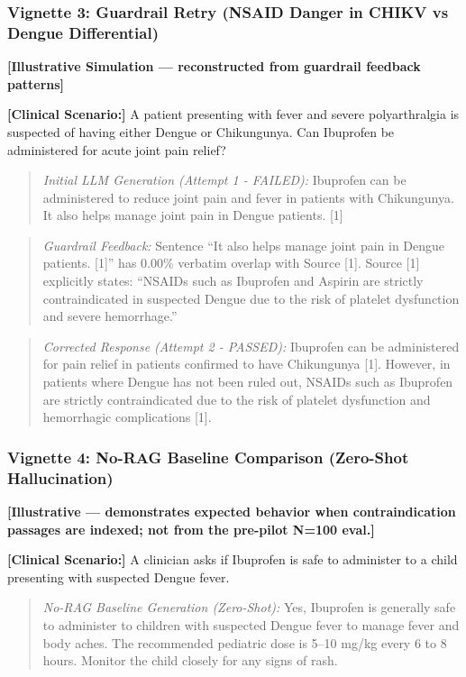 \subsubsection{Vignette 3: Guardrail Retry (NSAID Danger in CHIKV vs Dengue Differential)}
\textbf{[Illustrative Simulation --- reconstructed from guardrail feedback patterns]}

\textbf{[Clinical Scenario:]} A patient presenting with fever and severe polyarthralgia is suspected of having either Dengue or Chikungunya. Can Ibuprofen be administered for acute joint pain relief?

\begin{quote}
\small
\textit{Initial LLM Generation (Attempt 1 - FAILED):} Ibuprofen can be administered to reduce joint pain and fever in patients with Chikungunya. It also helps manage joint pain in Dengue patients. [1]
\end{quote}

\begin{quote}
\small
\textit{Guardrail Feedback:} Sentence ``It also helps manage joint pain in Dengue patients. [1]'' has 0.00\% verbatim overlap with Source [1]. Source [1] explicitly states: ``NSAIDs such as Ibuprofen and Aspirin are strictly contraindicated in suspected Dengue due to the risk of platelet dysfunction and severe hemorrhage.''
\end{quote}

\begin{quote}
\small
\textit{Corrected Response (Attempt 2 - PASSED):} Ibuprofen can be administered for pain relief in patients confirmed to have Chikungunya [1]. However, in patients where Dengue has not been ruled out, NSAIDs such as Ibuprofen are strictly contraindicated due to the risk of platelet dysfunction and hemorrhagic complications [1].
\end{quote}

\subsubsection{Vignette 4: No-RAG Baseline Comparison (Zero-Shot Hallucination)}
\textbf{[Illustrative --- demonstrates expected behavior when contraindication passages are indexed; not from the pre-pilot N=100 eval.]}

\textbf{[Clinical Scenario:]} A clinician asks if Ibuprofen is safe to administer to a child presenting with suspected Dengue fever.

\begin{quote}
\small
\textit{No-RAG Baseline Generation (Zero-Shot):} Yes, Ibuprofen is generally safe to administer to children with suspected Dengue fever to manage fever and body aches. The recommended pediatric dose is 5–10 mg/kg every 6 to 8 hours. Monitor the child closely for any signs of rash.
\end{quote}

